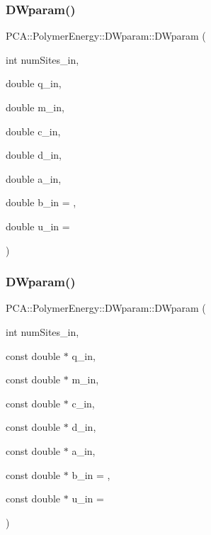 \subsubsection{\texorpdfstring{D\+Wparam()}{DWparam()}\hspace{0.1cm}{\footnotesize\ttfamily [1/2]}}
{\footnotesize\ttfamily P\+C\+A\+::\+Polymer\+Energy\+::\+D\+Wparam\+::\+D\+Wparam (\begin{DoxyParamCaption}\item[{int}]{num\+Sites\+\_\+in,  }\item[{double}]{q\+\_\+in,  }\item[{double}]{m\+\_\+in,  }\item[{double}]{c\+\_\+in,  }\item[{double}]{d\+\_\+in,  }\item[{double}]{a\+\_\+in,  }\item[{double}]{b\+\_\+in = {},  }\item[{double}]{u\+\_\+in = {} }\end{DoxyParamCaption})}

\hypertarget{class_p_c_a_1_1_polymer_energy_1_1_d_wparam_af9a9a24e85422d933fb527ef43a620a0}{}\label{class_p_c_a_1_1_polymer_energy_1_1_d_wparam_af9a9a24e85422d933fb527ef43a620a0} 
\subsubsection{\texorpdfstring{D\+Wparam()}{DWparam()}\hspace{0.1cm}{\footnotesize\ttfamily [2/2]}}
{\footnotesize\ttfamily P\+C\+A\+::\+Polymer\+Energy\+::\+D\+Wparam\+::\+D\+Wparam (\begin{DoxyParamCaption}\item[{int}]{num\+Sites\+\_\+in,  }\item[{const double $\ast$}]{q\+\_\+in,  }\item[{const double $\ast$}]{m\+\_\+in,  }\item[{const double $\ast$}]{c\+\_\+in,  }\item[{const double $\ast$}]{d\+\_\+in,  }\item[{const double $\ast$}]{a\+\_\+in,  }\item[{const double $\ast$}]{b\+\_\+in = {},  }\item[{const double $\ast$}]{u\+\_\+in = {} }\end{DoxyParamCaption})}

